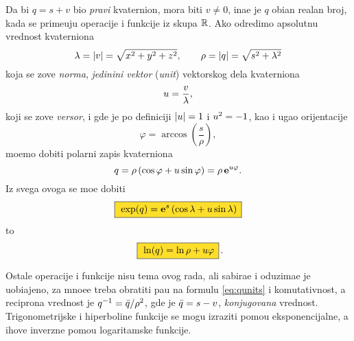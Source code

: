 Da bi $q=s+v$ bio {\sl pravi\/} kvaternion, mora biti $v\ne0$, ina{\cv}e je $q$ obi{\cv}an realan broj, 
kada se prime{\nj}uju operacije i funkcije iz skupa ${\mathbb R}$.
Ako odredimo apsolutnu vrednost kvaterniona
$$
\lambda = {\vert v\vert} = \sqrt{\mathstrut x^2+y^2+z^2},\qquad
\rho = {\vert q\vert} = \sqrt{\mathstrut s^2+\lambda^2}
$$
koja se zove {\sl norma\/},
{\sl jedini{\cv}ni vektor\/} ({\sl unit\/}) vektorskog dela kvaterniona
$$
{u} = \frac v\lambda, 
$$
koji se zove {\sl versor},
i gde je po definiciji ${\vert{u}\vert}=1$ i  ${u}^2=-1$,
kao i ugao orijentacije
$$
\varphi = \arccos\left( \frac s\rho \right),
$$
mo{\zv}emo dobiti polarni zapis kvaterniona
\begin{equation}
    q
=\rho\,(\cos\varphi + {u}\sin\varphi)
=\rho\,{\bf e}^{{u}\varphi}.
\end{equation}
Iz svega ovoga se mo{\zv}e dobiti
\begin{equation}
    \okvir{\exp(q) = \e^s \left( \cos\lambda + \uv\sin\lambda \right)}
\end{equation}
\hbox to \textwidth{\hss i\hss}
\begin{equation}
    \okvir{\ln(q)  = \ln\rho + \uv\varphi}\rlap{.}
\end{equation}

\medskip

\danger
Ostale operacije i funkcije nisu tema ovog rada, ali sabira{\nj}e i oduzima{\nj}e
je uobi\-{\cv}a\-jeno, za mno{\zv}e{\nj}e treba obratiti pa{\zv}{\nj}u na formulu \eqref{eq:qunits} i
komutativnost, a recipro{\cv}na vrednost je
$q^{-1}={\bar q}/\rho^2$, gde je ${\bar q}=s-v$, {\sl konjugovana\/} vrednost. 
Tri\-gono\-metrijske i hiperboli{\cv}ne funkcije se mogu izraziti pomo{\cc}u eksponencijalne,
a {\nj}ihove inverzne pomo{\cc}u logaritamske funkcije.\par

